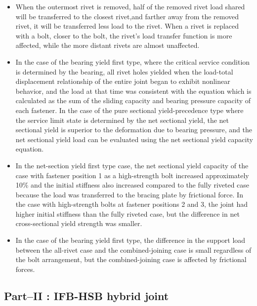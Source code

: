 \begin{itemize}

    \item When the outermost rivet is removed, half of the removed rivet load shared will be transferred to the closest rivet,and farther away from the removed rivet, it will be transferred less load to the rivet. When a rivet is replaced with a bolt, closer to the bolt, the rivet's load transfer function is more affected, while the more distant rivets are almost unaffected.

    \item In the case of the bearing yield first type, where the critical service condition is determined by the bearing, all rivet holes yielded when the load-total displacement relationship of the entire joint began to exhibit nonlinear behavior, and the load at that time was consistent with the equation which is calculated as the sum of the sliding capacity and bearing pressure capacity of each fastener. In the case of the pure sectional yield-precedence type where the service limit state is determined by the net sectional yield, the net sectional yield is superior to the deformation due to bearing pressure, and the net sectional yield load can be evaluated using the net sectional yield capacity equation.

    \item  In the net-section yield first type case, the net sectional yield capacity of the case with fastener position 1 as a high-strength bolt increased approximately 10\% and the initial stiffness also increased compared to the fully riveted case because the load was transferred to the bracing plate by frictional force. In the case with high-strength bolts at fastener positions 2 and 3, the joint had higher initial stiffness than the fully riveted case, but the difference in net cross-sectional yield strength was smaller.

    \item In the case of the bearing yield first type, the difference in the support load between the all-rivet case and the combined-joining case is small regardless of the bolt arrangement, but the combined-joining case is affected by frictional forces.

\end{itemize}


\subsection{Part--\RN{2} : IFB-HSB hybrid joint}

